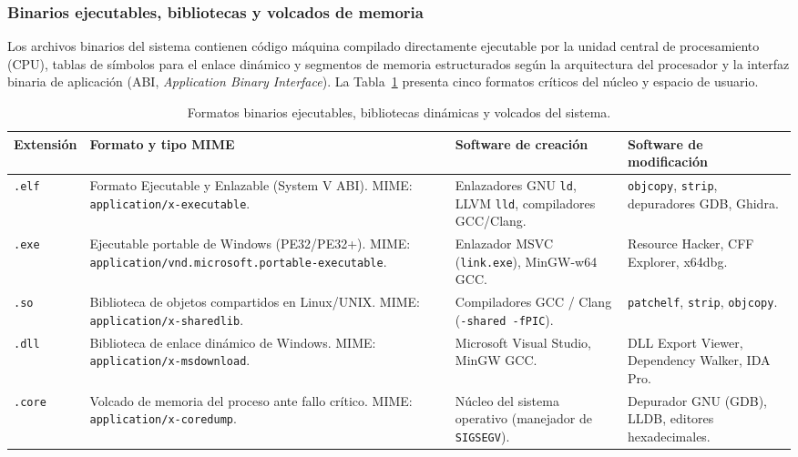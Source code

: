 \documentclass[12pt]{article}
\begin{document}
\subsubsection{Binarios ejecutables, bibliotecas y volcados de memoria}
Los archivos binarios del sistema contienen código máquina compilado directamente ejecutable por la unidad central de procesamiento (CPU), tablas de símbolos para el enlace dinámico y segmentos de memoria estructurados según la arquitectura del procesador y la interfaz binaria de aplicación (ABI, \textit{Application Binary Interface}). La Tabla~\ref{tab:formatosEjecutables} presenta cinco formatos críticos del núcleo y espacio de usuario.

\begin{table}[H]
\centering
\scriptsize
\renewcommand{\arraystretch}{0.95}
\renewcommand{\tabularxcolumn}[1]{m{#1}}
\setlength{\emergencystretch}{2em}
\caption{Formatos binarios ejecutables, bibliotecas dinámicas y volcados del sistema.}
\label{tab:formatosEjecutables}
\begin{tabularx}{\textwidth}{>{\centering\arraybackslash}m{1.8cm} X X X}
\toprule
\textbf{Extensión} & \textbf{Formato y tipo MIME} & \textbf{Software de creación} & \textbf{Software de modificación} \\
\midrule
\texttt{.elf} & Formato Ejecutable y Enlazable (System V ABI). MIME: \texttt{application/\allowbreak x-executable}. & Enlazadores GNU \texttt{ld}, LLVM \texttt{lld}, compiladores GCC/Clang. & \texttt{objcopy}, \texttt{strip}, depuradores GDB, Ghidra. \\
\texttt{.exe} & Ejecutable portable de Windows (PE32/PE32+). MIME: \texttt{application/\allowbreak vnd.microsoft.\allowbreak portable-executable}. & Enlazador MSVC (\texttt{link.exe}), MinGW-w64 GCC. & Resource Hacker, CFF Explorer, x64dbg. \\
\texttt{.so} & Biblioteca de objetos compartidos en Linux/UNIX. MIME: \texttt{application/\allowbreak x-sharedlib}. & Compiladores GCC / Clang (\texttt{-shared -fPIC}). & \texttt{patchelf}, \texttt{strip}, \texttt{objcopy}. \\
\texttt{.dll} & Biblioteca de enlace dinámico de Windows. MIME: \texttt{application/\allowbreak x-msdownload}. & Microsoft Visual Studio, MinGW GCC. & DLL Export Viewer, Dependency Walker, IDA Pro. \\
\texttt{.core} & Volcado de memoria del proceso ante fallo crítico. MIME: \texttt{application/x-coredump}. & Núcleo del sistema operativo (manejador de \texttt{SIGSEGV}). & Depurador GNU (GDB), LLDB, editores hexadecimales. \\
\bottomrule
\end{tabularx}
\end{table}
\end{document}
